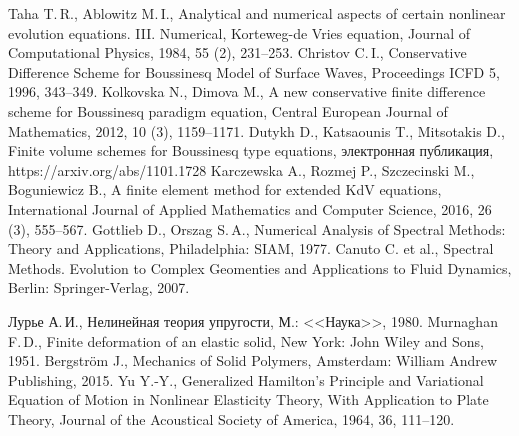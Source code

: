\documentclass[12pt, a4paper]{report}
\begin{document}
\begin{thebibliography}{99}
	 Taha T.\,R., Ablowitz M.\,I., Analytical and numerical aspects of certain nonlinear evolution equations. III. Numerical, Korteweg-de Vries equation, Journal of Computational Physics, 1984, 55 (2), 231--253.
	 Christov C.\,I., Conservative Difference Scheme for Boussinesq Model of Surface Waves, Proceedings ICFD 5, 1996, 343--349.
	 Kolkovska N., Dimova M., A new conservative finite difference scheme for Boussinesq paradigm equation, Central European Journal of Mathematics, 2012, 10 (3), 1159--1171.
	 Dutykh D., Katsaounis T., Mitsotakis D., Finite volume schemes for Boussinesq type equations, электронная публикация, https://arxiv.org/abs/1101.1728
	 Karczewska A., Rozmej P., Szczecinski M., Boguniewicz B., A finite element method for extended KdV equations, International Journal of Applied Mathematics and Computer Science, 2016, 26 (3), 555--567.
	 Gottlieb D., Orszag S.\,A., Numerical Analysis of Spectral Methods: Theory and Applications, Philadelphia: SIAM, 1977.
	 Canuto C. et al., Spectral Methods. Evolution to Complex Geomenties and Applications to Fluid Dynamics, Berlin: Springer-Verlag, 2007.
	
	 Лурье А.\,И., Нелинейная теория упругости, М.: <<Наука>>, 1980.
	 Murnaghan F.\,D., Finite deformation of an elastic solid, New York: John Wiley and Sons, 1951.
	 Bergstr\"{o}m J., Mechanics of Solid Polymers, Amsterdam: William Andrew Publishing, 2015.
	 Yu Y.-Y., Generalized Hamilton's Principle and Variational Equation of Motion in Nonlinear Elasticity Theory, With Application to Plate Theory, Journal of the Acoustical Society of America, 1964, 36, 111--120.
	

\end{thebibliography}
\end{document}
